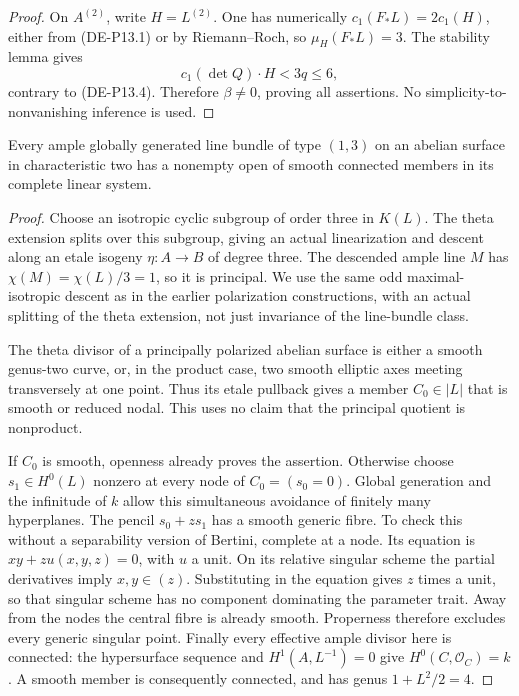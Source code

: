 \begin{proof}
On \(A^{(2)}\), write \(H=L^{(2)}\). One has numerically
\(c_1(F_*L)=2c_1(H)\), either from (DE-P13.1) or by
Riemann--Roch, so \(\mu_H(F_*L)=3\).
The stability lemma gives
\[
                     c_1(\det Q)\cdot H<3q\le6,
\]
contrary to (DE-P13.4). Therefore \(\beta\ne0\), proving all
assertions. No simplicity-to-nonvanishing inference is used.
\end{proof}

\begin{lemma}
\label{lem:DE-primitive-one-three-smooth-member}
Every ample globally generated line bundle of type \((1,3)\)
on an abelian surface in characteristic two has a nonempty open
of smooth connected members in its complete linear system.
\end{lemma}
\begin{proof}
Choose an isotropic cyclic subgroup of order three in \(K(L)\).
The theta extension splits over this subgroup, giving an actual
linearization and descent along an etale isogeny
\(\eta:A\to B\) of degree three. The descended ample line
\(M\) has \(\chi(M)=\chi(L)/3=1\), so it is principal.
We use the same odd maximal-isotropic descent as in the earlier
polarization constructions, with an actual splitting of the theta
extension, not just invariance of the line-bundle class.

The theta divisor of a principally polarized abelian surface is
either a smooth genus-two curve, or, in the product case, two
smooth elliptic axes meeting transversely at one point. Thus its
etale pullback gives a member \(C_0\in|L|\) that is smooth
or reduced nodal. This uses no claim that the principal quotient
is nonproduct.

If \(C_0\) is smooth, openness already proves the assertion.
Otherwise choose \(s_1\in H^0(L)\) nonzero at every node of
\(C_0=(s_0=0)\). Global generation and the infinitude of \(k\)
allow this simultaneous avoidance of finitely many hyperplanes.
The pencil \(s_0+z s_1\) has a smooth generic fibre. To check
this without a separability version of Bertini, complete at a node.
Its equation is \(xy+z u(x,y,z)=0\), with \(u\) a unit.
On its relative singular scheme the partial derivatives imply
\(x,y\in(z)\). Substituting in the equation gives \(z\) times
a unit, so that singular scheme has no component dominating the
parameter trait. Away from the nodes the central fibre is already
smooth. Properness therefore excludes every generic singular point.
Finally every effective ample divisor here is connected: the
hypersurface sequence and \(H^1(A,L^{-1})=0\) give
\(H^0(C,\mathcal O_C)=k\). A smooth member is consequently
connected, and has genus \(1+L^2/2=4\).
\end{proof}

